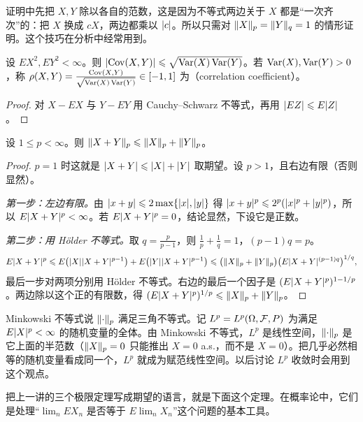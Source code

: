 \begin{remark}[归一化的技巧]
证明中先把 $X,Y$ 除以各自的范数，这是因为不等式两边关于 $X$ 都是“一次齐次”的：把 $X$ 换成 $cX$，两边都乘以 $\lvert c\rvert$。所以只需对 $\lVert X\rVert_p=\lVert Y\rVert_q=1$ 的情形证明。这个技巧在分析中经常用到。
\end{remark}

\begin{corollary}[相关系数]\label{cor:expectation:correlation}
设 $EX^2,EY^2<\infty$。则 $\lvert \operatorname{Cov}(X,Y)\rvert\leqslant\sqrt{\operatorname{Var}(X)\operatorname{Var}(Y)}$。若 $\operatorname{Var}(X),\operatorname{Var}(Y)>0$，称 $\rho(X,Y)=\frac{\operatorname{Cov}(X,Y)}{\sqrt{\operatorname{Var}(X)\operatorname{Var}(Y)}}\in[-1,1]$ 为（correlation coefficient）。
\end{corollary}
\begin{proof}
对 $X-EX$ 与 $Y-EY$ 用 Cauchy--Schwarz 不等式，再用 $\lvert E Z\rvert\leqslant E\lvert Z\rvert$。
\end{proof}

\begin{theorem}\label{thm:expectation:minkowski}
设 $1\leqslant p<\infty$。则 $\lVert X+Y\rVert_p\leqslant\lVert X\rVert_p+\lVert Y\rVert_p$。
\end{theorem}
\begin{proof}
$p=1$ 时这就是 $\lvert X+Y\rvert\leqslant\lvert X\rvert+\lvert Y\rvert$ 取期望。设 $p>1$，且右边有限（否则显然）。

\emph{第一步：左边有限。}由 $\lvert x+y\rvert\leqslant2\max\{\lvert x\rvert,\lvert y\rvert\}$ 得 $\lvert x+y\rvert^p\leqslant2^p(\lvert x\rvert^p+\lvert y\rvert^p)$，所以 $E\lvert X+Y\rvert^p<\infty$。若 $E\lvert X+Y\rvert^p=0$，结论显然，下设它是正数。

\emph{第二步：用 Hölder 不等式。}取 $q=\frac p{p-1}$，则 $\frac1p+\frac1q=1$，$(p-1)q=p$。
\[
E\lvert X+Y\rvert^p\leqslant E\bigl(\lvert X\rvert\lvert X+Y\rvert^{p-1}\bigr)+E\bigl(\lvert Y\rvert\lvert X+Y\rvert^{p-1}\bigr)\leqslant\bigl(\lVert X\rVert_p+\lVert Y\rVert_p\bigr)\bigl(E\lvert X+Y\rvert^{(p-1)q}\bigr)^{1/q},
\]
最后一步对两项分别用 Hölder 不等式。右边的最后一个因子是 $(E\lvert X+Y\rvert^p)^{1-1/p}$。两边除以这个正的有限数，得 $(E\lvert X+Y\rvert^p)^{1/p}\leqslant\lVert X\rVert_p+\lVert Y\rVert_p$。
\end{proof}

Minkowski 不等式说 $\lVert \cdot\rVert_p$ 满足三角不等式。记 $L^p=L^p(\Omega,\mathcal{F},P)$ 为满足 $E\lvert X\rvert^p<\infty$ 的随机变量的全体。由 Minkowski 不等式，$L^p$ 是线性空间，$\lVert \cdot\rVert_p$ 是它上面的半范数（$\lVert X\rVert_p=0$ 只能推出 $X=0$ a.s.，而不是 $X=0$）。把几乎必然相等的随机变量看成同一个，$L^p$ 就成为赋范线性空间。以后讨论 $L^p$ 收敛时会用到这个观点。


把上一讲的三个极限定理写成期望的语言，就是下面这个定理。在概率论中，它们是处理“$\lim_nEX_n$ 是否等于 $E\lim_nX_n$”这个问题的基本工具。

